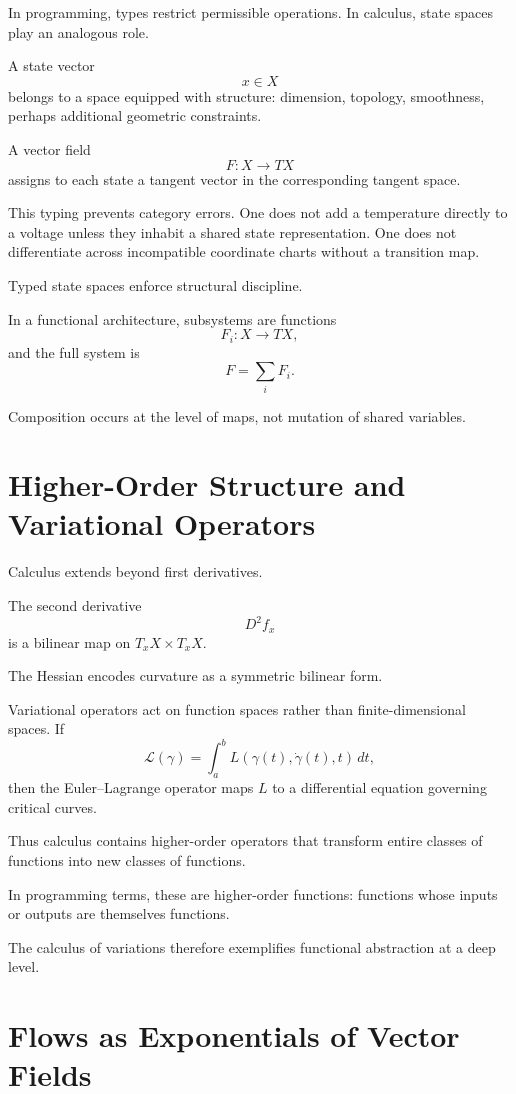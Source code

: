 \documentclass[12pt]{book}
\begin{document}
In programming, types restrict permissible operations. In calculus, state spaces play an analogous role.

A state vector
\[
x \in X
\]
belongs to a space equipped with structure: dimension, topology, smoothness, perhaps additional geometric constraints.

A vector field
\[
F : X \to TX
\]
assigns to each state a tangent vector in the corresponding tangent space.

This typing prevents category errors. One does not add a temperature directly to a voltage unless they inhabit a shared state representation. One does not differentiate across incompatible coordinate charts without a transition map.

Typed state spaces enforce structural discipline.

In a functional architecture, subsystems are functions
\[
F_i : X \to TX,
\]
and the full system is
\[
F = \sum_i F_i.
\]

Composition occurs at the level of maps, not mutation of shared variables.

\section{Higher-Order Structure and Variational Operators}

Calculus extends beyond first derivatives.

The second derivative
\[
D^2 f_x
\]
is a bilinear map on $T_x X \times T_x X$.

The Hessian encodes curvature as a symmetric bilinear form.

Variational operators act on function spaces rather than finite-dimensional spaces. If
\[
\mathcal{L}(\gamma)
=
\int_a^b L(\gamma(t), \dot{\gamma}(t), t)\, dt,
\]
then the Euler--Lagrange operator maps $L$ to a differential equation governing critical curves.

Thus calculus contains higher-order operators that transform entire classes of functions into new classes of functions.

In programming terms, these are higher-order functions: functions whose inputs or outputs are themselves functions.

The calculus of variations therefore exemplifies functional abstraction at a deep level.

\section{Flows as Exponentials of Vector Fields}
\end{document}
